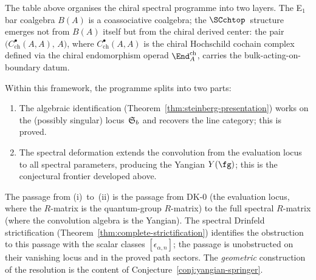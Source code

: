 \begin{remark}
\label{rem:chriss-ginzburg-chiral}
The table above organises the chiral spectral programme into two
layers. The E$_1$ bar coalgebra $B(A)$ is a coassociative
coalgebra; the $\SCchtop$~structure emerges not from $B(A)$ itself
but from the chiral derived center: the pair
$\bigl(C^\bullet_{\mathrm{ch}}(A,A),\,A\bigr)$, where
$C^\bullet_{\mathrm{ch}}(A,A)$ is the chiral Hochschild cochain
complex defined via the chiral endomorphism operad
$\End^{\mathrm{ch}}_A$, carries the bulk-acting-on-boundary datum.

Within this framework, the programme splits into two parts:
\begin{enumerate}[label=(\roman*)]
\item The algebraic identification
 (Theorem~\ref{thm:steinberg-presentation}) works on the (possibly
 singular) locus~$\mathfrak{S}_b$ and recovers the line category;
 this is proved.
\item The spectral deformation extends the convolution from the
 evaluation locus to all spectral parameters, producing the
 Yangian $Y(\fg)$; this is the conjectural frontier developed
 above.
\end{enumerate}

The passage from (i)~to~(ii) is the passage from DK-$0$ (the
evaluation locus, where the $R$-matrix is the quantum-group
$R$-matrix) to the full spectral $R$-matrix (where the convolution
algebra is the Yangian). The spectral Drinfeld strictification
(Theorem~\ref{thm:complete-strictification}) identifies the
obstruction to this passage with the scalar classes
$[\epsilon_{\alpha,n}]$; the passage is unobstructed on their
vanishing locus and in the proved path sectors. The
\emph{geometric} construction of the resolution is the content of
Conjecture~\ref{conj:yangian-springer}.
\end{remark}

